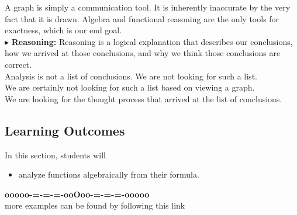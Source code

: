 \documentclass{ximera}
\begin{document}
A graph is simply a communication tool.  It is inherently inaccurate by the very fact that it is drawn.  Algebra and functional reasoning are the only tools for exactness, which is our end goal. \\



$\blacktriangleright$ \textbf{\textcolor{red!70!black}{Reasoning:}} Reasoning is a logical explanation that describes our conclusions, how we arrived at those conclusions, and why we think those conclusions are correct. \\

Analysis is not a list of conclusions. We are not looking for such a list. \\

We are certainly not looking for such a list based on viewing a graph. \\

We are looking for the thought process that arrived at the list of conclusions. \\





\subsection*{Learning Outcomes}


\begin{sectionOutcomes}
In this section, students will 

\begin{itemize}
\item analyze functions algebraically from their formula.
\end{itemize}
\end{sectionOutcomes}


















\begin{center}
\textbf{\textcolor{green!50!black}{ooooo-=-=-=-ooOoo-=-=-=-ooooo}} \\

more examples can be found by following this link\\ 

\end{center}
\end{document}
